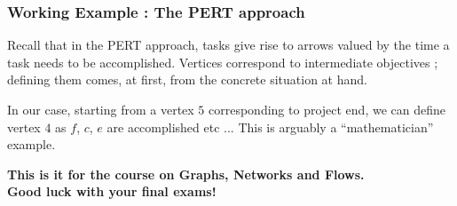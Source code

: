 \documentclass[32pt,aspectratio=169]{beamer}
\begin{document}
\begin{frame}
  \frametitle{Working Example : The PERT approach}
  Recall that in the PERT approach, tasks give rise to arrows valued
  by the time a task needs to be accomplished. Vertices correspond to
  intermediate objectives ; defining them comes, at first, from the
  concrete situation at hand. 

  \vspace{.3\baselineskip}
  In our case, starting from a vertex $5$ corresponding to project
  end, we can define vertex $4$ as $f$, $c$, $e$ are accomplished etc
  ... This is arguably a ``mathematician'' example.
  \begin{figure}
    \centering
  \end{figure}
\end{frame}{}

\begin{frame}
  \centering
{\Large \textbf{This is it for the course on Graphs, Networks and Flows.\\
    Good luck with your final exams!}}
\end{frame}


\end{document}
